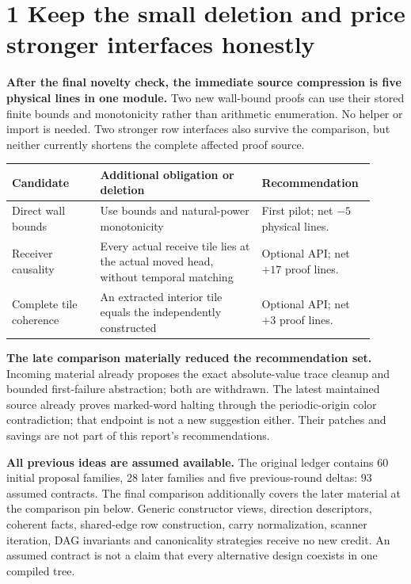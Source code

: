 \section*{1 Keep the small deletion and price stronger interfaces honestly}
\textbf{After the final novelty check, the immediate source compression is five physical lines in one module.} Two new wall-bound proofs can use their stored finite bounds and monotonicity rather than arithmetic enumeration. No helper or import is needed. Two stronger row interfaces also survive the comparison, but neither currently shortens the complete affected proof source.

\begin{tabular}{@{}L{0.23\linewidth}L{0.42\linewidth}L{0.26\linewidth}@{}}
\toprule
Candidate & Additional obligation or deletion & Recommendation\\\midrule
Direct wall bounds & Use  bounds and natural-power monotonicity & First pilot; net $-5$ physical lines.\\[6pt]
Receiver causality & Every actual receive tile lies at the actual moved head, without temporal matching & Optional API; net $+17$ proof lines.\\[6pt]
Complete tile coherence & An extracted interior tile equals the independently constructed  & Optional API; net $+3$ proof lines.\\\bottomrule
\end{tabular}

\textbf{The late comparison materially reduced the recommendation set.} Incoming material already proposes the exact absolute-value trace cleanup and bounded first-failure abstraction; both are withdrawn. The latest maintained source already proves marked-word halting through the periodic-origin color contradiction; that endpoint is not a new suggestion either. Their patches and savings are not part of this report's recommendations.

\textbf{All previous ideas are assumed available.} The original ledger contains 60 initial proposal families, 28 later families and five previous-round deltas: 93 assumed contracts. The final comparison additionally covers the later material at the comparison pin below. Generic constructor views, direction descriptors, coherent facts, shared-edge row construction, carry normalization, scanner iteration, DAG invariants and canonicality strategies receive no new credit. An assumed contract is not a claim that every alternative design coexists in one compiled tree.

